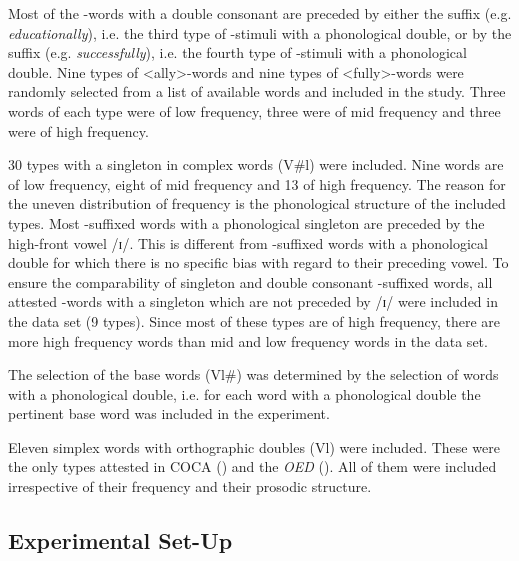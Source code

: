 Most of the -words with a double consonant are preceded by either the suffix  (e.g. \textit{educationally}), i.e. the third type of -stimuli with a phonological double, or by the suffix  (e.g. \textit{successfully}), i.e. the fourth type of -stimuli with a phonological double. Nine types of <ally>-words and nine types of <fully>-words were randomly selected from a list of available words and included in the study. Three words of each type were of low frequency, three were of mid frequency and three were of high frequency.



30 types with a singleton in complex words (V\#l) were included. Nine words are of low frequency, eight of mid frequency and 13 of high frequency. The reason for the uneven distribution of frequency is the phonological structure of the included types. Most -suffixed words with a phonological singleton are preceded by the high-front vowel /ɪ/. This is different from -suffixed words with a phonological double for which there is no specific bias with regard to their preceding vowel. To ensure the comparability of singleton and double consonant -suffixed words, all attested -words with a singleton which are not preceded by /ɪ/ were included in the data set (9 types). Since most of these types are of high frequency, there are more high frequency words than mid and low frequency words in the data set. %






The selection of the base words (Vl\#) was determined by the selection of words with a phonological double, i.e.  for each word with a phonological double the pertinent base word was included in the experiment. 

Eleven simplex words with orthographic doubles (Vl) were included. These were the only types attested in COCA (\citealt{Davies.20082014}) and the \textit{OED} (\citealt{OED.2013}). 
All of them were included irrespective of their frequency and their prosodic structure. 





\subsection{Experimental Set-Up}

